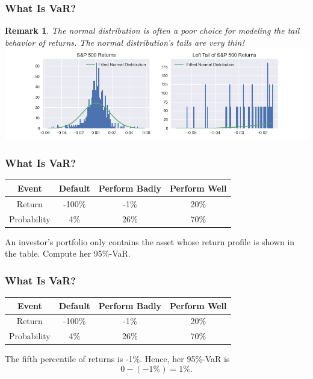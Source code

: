 \documentclass{beamer}
\newtheorem*{remark}{Remark}
\begin{document}
\begin{frame}
\frametitle{What Is VaR?}
\begin{remark}
The normal distribution is often a poor choice for modeling the tail behavior of returns. The normal distribution's tails are very thin!
\includegraphics[scale = 0.4]{norm_tail.png}
\end{remark}
\end{frame}

\begin{frame}
\frametitle{What Is VaR?}
\begin{center}
\begin{tabular}{| c | c c c |}
\hline
Event		&	Default	&	Perform Badly	&	Perform Well		\\\hline
Return	&	-100\%	&	-1\%			&	20\%			\\
Probability	&	4\%		&	26\%			&	70\%			\\\hline
\end{tabular}
\end{center}
\begin{example}
An investor's portfolio only contains the asset whose return profile is shown in the table. Compute her 95\%-VaR.
\end{example}

\end{frame}

\begin{frame}
\frametitle{What Is VaR?}
\begin{center}
\begin{tabular}{| c | c c c |}
\hline
Event		&	Default	&	Perform Badly	&	Perform Well		\\\hline
Return	&	-100\%	&	-1\%			&	20\%			\\
Probability	&	4\%		&	26\%			&	70\%			\\\hline
\end{tabular}
\end{center}
\begin{solution}
The fifth percentile of returns is -1\%. Hence, her 95\%-VaR is
$$
0 - (-1\%) = 1\%.
$$
\end{solution}

\end{frame}
\end{document}
